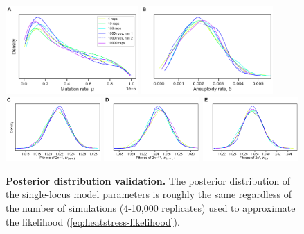 \documentclass[12pt]{extarticle}
\begin{document}
\begin{figure}[h]
    \centering
      \includegraphics[width=0.45\textwidth]{../figures/runs-A.pdf}      
      \includegraphics[width=0.45\textwidth]{../figures/runs-B.pdf}    
      \includegraphics[width=0.325\textwidth]{../figures/runs-C.pdf}      
      \includegraphics[width=0.325\textwidth]{../figures/runs-D.pdf}      
      \includegraphics[width=0.325\textwidth]{../figures/runs-E.pdf} 
       \caption{
    \textbf{Posterior distribution validation.}
    The posterior distribution of the single-locus model parameters is roughly the same regardless of the number of simulations (4-10,000 replicates) used to approximate the likelihood (\cref{eq:heatstress-likelihood}).
    } 
     
     \label{fig:seeds}
 \end{figure}
 
\end{document}
